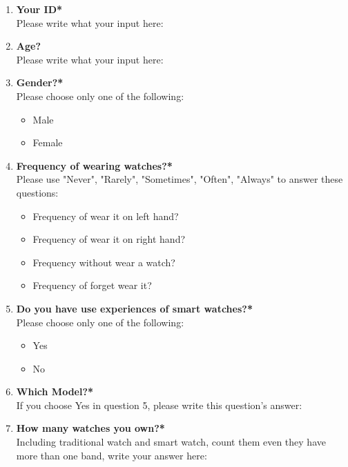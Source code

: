   \begin{enumerate}
      \kaishu
      \item \textbf{Your ID*}\\
      Please write what your input here:
      \item \textbf{Age?}\\
      Please write what your input here:
      \item \textbf{Gender?*}\\
      Please choose only one of the following:
      \begin{itemize}
          \item Male
          \item Female
      \end{itemize}
      \item \textbf{Frequency of wearing watches?*}\\
      Please use "Never", "Rarely", "Sometimes", "Often", "Always" to answer these questions:
      \begin{itemize}
          \item Frequency of wear it on left hand?
          \item Frequency of wear it on right hand?
          \item Frequency without wear a watch?
          \item Frequency of forget wear it?
      \end{itemize}
      \item \textbf{Do you have use experiences of smart watches?*}\\
      Please choose only one of the following:
      \begin{itemize}
          \item Yes
          \item No
      \end{itemize}
      \item \textbf{Which Model?*}\\
      If you choose Yes in question 5, please write this question's answer:
      \item \textbf{How many watches you own?*}\\
      Including traditional watch and smart watch, count them even they have more than one band, write your answer here:

\end{enumerate}
